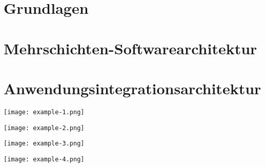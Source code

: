 





\newcommand{\TITLE}{Test Cheat Sheet}
\newcommand{\DELIVERYDATE}{22.02.2021}


    \setlength{\columnseprule}{0.4pt}
    \footnotesize
    \begin{multicols*}{4}
        \setlength{\columnseprule}{0.4pt}
        \section{Grundlagen}
        
        \vfill\null
        \columnbreak
        
        \newpage
        \section{Mehrschichten-Softwarearchitektur}
        
        \vfill\null
        \columnbreak
        
        \vfill\null
        \columnbreak
        
        \vfill\null
        \columnbreak
        
        \newpage
        \section{Anwendungsintegrationsarchitektur}
        
        \vfill\null
        \columnbreak
        
        \vfill\null
        \columnbreak
        
        \vfill\null
        \columnbreak
        


    \end{multicols*}

    \begin{multicols*}{2}
        \setlength{\columnseprule}{0.4pt}

        \texttt{[image: example-1.png]}

        \texttt{[image: example-2.png]}

        \texttt{[image: example-3.png]}

        \texttt{[image: example-4.png]}
    \end{multicols*}


